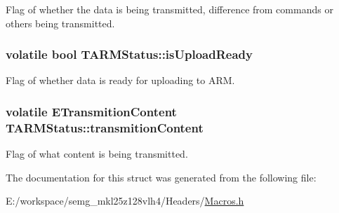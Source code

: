Flag of whether the data is being transmitted, difference from commands or others being transmitted. \hypertarget{struct_t_a_r_m_status_a5ae99606de7e85202a6cb953d1aeed56}{
\subsubsection[{is\-Upload\-Ready}]{\setlength{\rightskip}{0pt plus 5cm}volatile bool T\-A\-R\-M\-Status\-::is\-Upload\-Ready}}\label{struct_t_a_r_m_status_a5ae99606de7e85202a6cb953d1aeed56}
Flag of whether data is ready for uploading to A\-R\-M. \hypertarget{struct_t_a_r_m_status_a35402597843e9a17d7dfb718c15c06f2}{
\subsubsection[{transmition\-Content}]{\setlength{\rightskip}{0pt plus 5cm}volatile {\bf E\-Transmition\-Content} T\-A\-R\-M\-Status\-::transmition\-Content}}\label{struct_t_a_r_m_status_a35402597843e9a17d7dfb718c15c06f2}
Flag of what content is being transmitted. 

The documentation for this struct was generated from the following file\-:\begin{DoxyCompactItemize}
\item 
E\-:/workspace/semg\-\_\-mkl25z128vlh4/\-Headers/\hyperlink{_macros_8h}{Macros.\-h}\end{DoxyCompactItemize}
